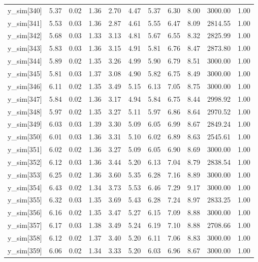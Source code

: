 \begin{table}[ht]
\begin{tabular}{rrrrrrrrrrr}
  y\_sim[340] & 5.37 & 0.02 & 1.36 & 2.70 & 4.47 & 5.37 & 6.30 & 8.00 & 3000.00 & 1.00 \\ 
  y\_sim[341] & 5.53 & 0.03 & 1.36 & 2.87 & 4.61 & 5.55 & 6.47 & 8.09 & 2814.55 & 1.00 \\ 
  y\_sim[342] & 5.68 & 0.03 & 1.33 & 3.13 & 4.81 & 5.67 & 6.55 & 8.32 & 2825.99 & 1.00 \\ 
  y\_sim[343] & 5.83 & 0.03 & 1.36 & 3.15 & 4.91 & 5.81 & 6.76 & 8.47 & 2873.80 & 1.00 \\ 
  y\_sim[344] & 5.89 & 0.02 & 1.35 & 3.26 & 4.99 & 5.90 & 6.79 & 8.51 & 3000.00 & 1.00 \\ 
  y\_sim[345] & 5.81 & 0.03 & 1.37 & 3.08 & 4.90 & 5.82 & 6.75 & 8.49 & 3000.00 & 1.00 \\ 
  y\_sim[346] & 6.11 & 0.02 & 1.35 & 3.49 & 5.15 & 6.13 & 7.05 & 8.75 & 3000.00 & 1.00 \\ 
  y\_sim[347] & 5.84 & 0.02 & 1.36 & 3.17 & 4.94 & 5.84 & 6.75 & 8.44 & 2998.92 & 1.00 \\ 
  y\_sim[348] & 5.97 & 0.02 & 1.35 & 3.27 & 5.11 & 5.97 & 6.86 & 8.64 & 2970.52 & 1.00 \\ 
  y\_sim[349] & 6.03 & 0.03 & 1.39 & 3.30 & 5.09 & 6.05 & 6.99 & 8.67 & 2849.24 & 1.00 \\ 
  y\_sim[350] & 6.01 & 0.03 & 1.36 & 3.31 & 5.10 & 6.02 & 6.89 & 8.63 & 2545.61 & 1.00 \\ 
  y\_sim[351] & 6.02 & 0.02 & 1.36 & 3.27 & 5.09 & 6.05 & 6.90 & 8.69 & 3000.00 & 1.00 \\ 
  y\_sim[352] & 6.12 & 0.03 & 1.36 & 3.44 & 5.20 & 6.13 & 7.04 & 8.79 & 2838.54 & 1.00 \\ 
  y\_sim[353] & 6.25 & 0.02 & 1.36 & 3.60 & 5.35 & 6.28 & 7.16 & 8.89 & 3000.00 & 1.00 \\ 
  y\_sim[354] & 6.43 & 0.02 & 1.34 & 3.73 & 5.53 & 6.46 & 7.29 & 9.17 & 3000.00 & 1.00 \\ 
  y\_sim[355] & 6.32 & 0.03 & 1.35 & 3.69 & 5.43 & 6.28 & 7.24 & 8.97 & 2833.25 & 1.00 \\ 
  y\_sim[356] & 6.16 & 0.02 & 1.35 & 3.47 & 5.27 & 6.15 & 7.09 & 8.88 & 3000.00 & 1.00 \\ 
  y\_sim[357] & 6.17 & 0.03 & 1.38 & 3.49 & 5.24 & 6.19 & 7.10 & 8.88 & 2708.66 & 1.00 \\ 
  y\_sim[358] & 6.12 & 0.02 & 1.37 & 3.40 & 5.20 & 6.11 & 7.06 & 8.83 & 3000.00 & 1.00 \\ 
  y\_sim[359] & 6.06 & 0.02 & 1.34 & 3.33 & 5.20 & 6.03 & 6.96 & 8.67 & 3000.00 & 1.00 \\ 

\end{tabular}
\end{table}
